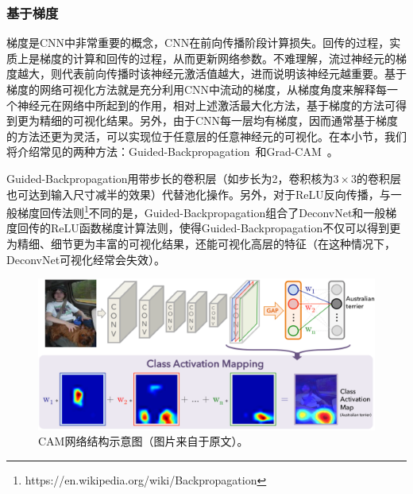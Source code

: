 \subsubsection{基于梯度}\label{subsec:gradient_based_methods}
梯度是CNN中非常重要的概念，CNN在前向传播阶段计算损失。回传的过程，实质上是梯度的计算和回传的过程，从而更新网络参数。不难理解，流过神经元的梯度越大，则代表前向传播时该神经元激活值越大，进而说明该神经元越重要。基于梯度的网络可视化方法就是充分利用CNN中流动的梯度，从梯度角度来解释每一个神经元在网络中所起到的作用，相对上述激活最大化方法，基于梯度的方法可得到更为精细的可视化结果。另外，由于CNN每一层均有梯度，因而通常基于梯度的方法还更为灵活，可以实现位于任意层的任意神经元的可视化。在本小节，我们将介绍常见的两种方法：Guided-Backpropagation~\cite{springenberg2014striving}和Grad-CAM~\cite{selvaraju2017grad}。

Guided-Backpropagation用带步长的卷积层（如步长为2，卷积核为$3\times 3$的卷积层也可达到输入尺寸减半的效果）代替池化操作。另外，对于ReLU反向传播，与一般梯度回传法则\footnote{https://en.wikipedia.org/wiki/Backpropagation}不同的是，Guided-Backpropagation组合了DeconvNet和一般梯度回传的ReLU函数梯度计算法则，使得Guided-Backpropagation不仅可以得到更为精细、细节更为丰富的可视化结果，还能可视化高层的特征（在这种情况下，DeconvNet可视化经常会失效）。

\begin{figure}[h]
	\centering
	\includegraphics[width=1.0\textwidth]{figure/cam_arichitecture}
	\caption{CAM网络结构示意图（图片来自于原文）。}
	\label{fig:cam_arichitecture}
\end{figure}

